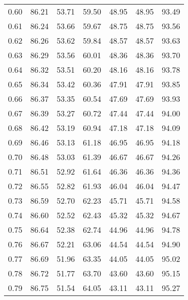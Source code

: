 \begin{tabular}{|c|c|c|c|c|c|c|}
      0.60 &     86.21 &     53.71 &      59.50 &   48.95 &      48.95 &         93.49 \\
      0.61 &     86.24 &     53.66 &      59.67 &   48.75 &      48.75 &         93.56 \\
      0.62 &     86.26 &     53.62 &      59.84 &   48.57 &      48.57 &         93.63 \\
      0.63 &     86.29 &     53.56 &      60.01 &   48.36 &      48.36 &         93.70 \\
      0.64 &     86.32 &     53.51 &      60.20 &   48.16 &      48.16 &         93.78 \\
      0.65 &     86.34 &     53.42 &      60.36 &   47.91 &      47.91 &         93.85 \\
      0.66 &     86.37 &     53.35 &      60.54 &   47.69 &      47.69 &         93.93 \\
      0.67 &     86.39 &     53.27 &      60.72 &   47.44 &      47.44 &         94.00 \\
      0.68 &     86.42 &     53.19 &      60.94 &   47.18 &      47.18 &         94.09 \\
      0.69 &     86.46 &     53.13 &      61.18 &   46.95 &      46.95 &         94.18 \\
      0.70 &     86.48 &     53.03 &      61.39 &   46.67 &      46.67 &         94.26 \\
      0.71 &     86.51 &     52.92 &      61.64 &   46.36 &      46.36 &         94.36 \\
      0.72 &     86.55 &     52.82 &      61.93 &   46.04 &      46.04 &         94.47 \\
      0.73 &     86.59 &     52.70 &      62.23 &   45.71 &      45.71 &         94.58 \\
      0.74 &     86.60 &     52.52 &      62.43 &   45.32 &      45.32 &         94.67 \\
      0.75 &     86.64 &     52.38 &      62.74 &   44.96 &      44.96 &         94.78 \\
      0.76 &     86.67 &     52.21 &      63.06 &   44.54 &      44.54 &         94.90 \\
      0.77 &     86.69 &     51.96 &      63.35 &   44.05 &      44.05 &         95.02 \\
      0.78 &     86.72 &     51.77 &      63.70 &   43.60 &      43.60 &         95.15 \\
      0.79 &     86.75 &     51.54 &      64.05 &   43.11 &      43.11 &         95.27 \\

\end{tabular}
